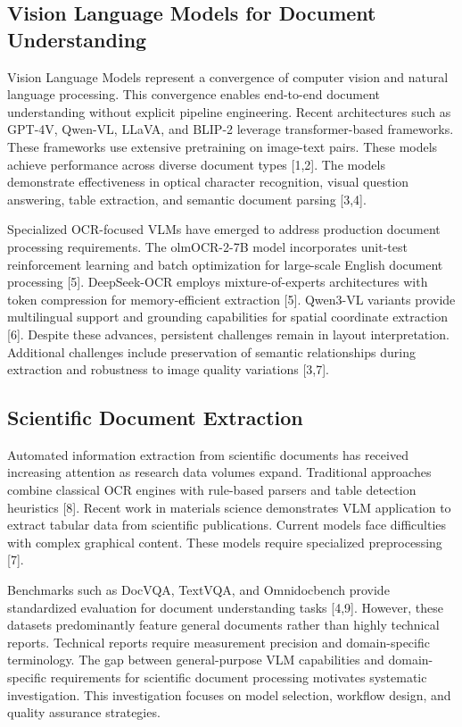 \documentclass{svproc}
\begin{document}
\subsection{Vision Language Models for Document Understanding}

Vision Language Models represent a convergence of computer vision and natural language processing. This convergence enables end-to-end document understanding without explicit pipeline engineering. Recent architectures such as GPT-4V, Qwen-VL, LLaVA, and BLIP-2 leverage transformer-based frameworks. These frameworks use extensive pretraining on image-text pairs. These models achieve performance across diverse document types [1,2]. The models demonstrate effectiveness in optical character recognition, visual question answering, table extraction, and semantic document parsing [3,4].

Specialized OCR-focused VLMs have emerged to address production document processing requirements. The olmOCR-2-7B model incorporates unit-test reinforcement learning and batch optimization for large-scale English document processing [5]. DeepSeek-OCR employs mixture-of-experts architectures with token compression for memory-efficient extraction [5]. Qwen3-VL variants provide multilingual support and grounding capabilities for spatial coordinate extraction [6]. Despite these advances, persistent challenges remain in layout interpretation. Additional challenges include preservation of semantic relationships during extraction and robustness to image quality variations [3,7].

\subsection{Scientific Document Extraction}

Automated information extraction from scientific documents has received increasing attention as research data volumes expand. Traditional approaches combine classical OCR engines with rule-based parsers and table detection heuristics [8]. Recent work in materials science demonstrates VLM application to extract tabular data from scientific publications. Current models face difficulties with complex graphical content. These models require specialized preprocessing [7].

Benchmarks such as DocVQA, TextVQA, and Omnidocbench provide standardized evaluation for document understanding tasks [4,9]. However, these datasets predominantly feature general documents rather than highly technical reports. Technical reports require measurement precision and domain-specific terminology. The gap between general-purpose VLM capabilities and domain-specific requirements for scientific document processing motivates systematic investigation. This investigation focuses on model selection, workflow design, and quality assurance strategies.
\end{document}
